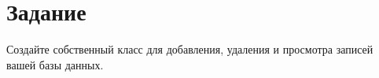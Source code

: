 \section{Задание}

Создайте собственный класс для добавления, удаления и просмотра
записей вашей базы данных.
